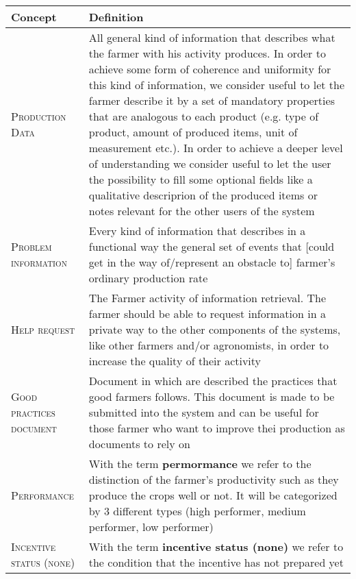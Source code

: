 \begin{table}[H]
    \setlength\arrayrulewidth{1pt}
    \centering
    \begin{tabular}{|m{}|m{}|}
        \rowcolor{myblue}
        \hline
        \color{white}Concept & \color{white}Definition \\
        \hline
        \textsc{Production Data}     &   All general kind of information that describes what the farmer with his activity produces. In order to achieve some form of coherence and uniformity for this kind of information, we consider useful to let the farmer describe it by a set of mandatory properties that are analogous to each product (e.g. type of product, amount of produced items, unit of measurement etc.). In order to achieve a deeper level of understanding we consider useful to let the user the possibility to fill some optional fields like a qualitative descriprion of the produced items or notes relevant for the other users of the system \\
        \hline
        \textsc{Problem information}  &   Every kind of information that describes in a functional way the general set of events that [could get in the way of/represent an obstacle to] farmer's ordinary production rate \\
        \hline
        \textsc{Help request}     &   The Farmer activity of information retrieval. The farmer should be able to request information in a private way to the other components of the systems, like other farmers and/or agronomists, in order to increase the quality of their activity \\
        \hline
        \textsc{\nohyphens{Good  practices document}}     &   Document in which are described the practices that good farmers follows. This document is made to be submitted into the system and can be useful for those farmer who want to improve thei production as documents to rely on \\
        \hline
        \textsc{Performance}     &   With the term \textbf{permormance} we refer to the distinction of the farmer's productivity such as they produce the crops well or not. It will be categorized by 3 different types (high performer, medium performer, low performer) \\
        \hline
        \textsc{Incentive status (none)}  &   With the term \textbf{incentive status (none)} we refer to the condition that the incentive has not prepared yet \\
        \hline

\end{tabular}
\end{table}
